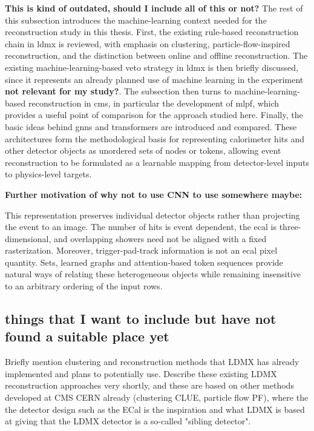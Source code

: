 \textbf{This is kind of outdated, should I include all of this or not?} The rest of this subsection introduces the machine-learning context needed for the reconstruction study in this thesis. First, the existing rule-based reconstruction chain in \gls{ldmx} is reviewed, with emphasis on clustering, particle-flow-inspired reconstruction, and the distinction between online and offline reconstruction. The existing machine-learning-based veto strategy in \gls{ldmx} is then briefly discussed, since it represents an already planned use of machine learning in the experiment \textbf{not relevant for my study?}. The subsection then turns to machine-learning-based reconstruction in \gls{cms}, in particular the development of \gls{mlpf}, which provides a useful point of comparison for the approach studied here. Finally, the basic ideas behind \glspl{gnn} and transformers are introduced and compared. These architectures form the methodological basis for representing calorimeter hits and other detector objects as unordered sets of nodes or tokens, allowing event reconstruction to be formulated as a learnable mapping from detector-level inputs to physics-level targets.

\textbf{Further motivation of why not to use CNN to use somewhere maybe:}

This representation preserves individual detector objects rather than
projecting the event to an image. The number of hits is event dependent, the
\gls{ecal} is three-dimensional, and overlapping showers need not be aligned
with a fixed rasterization. Moreover, trigger-pad-track information is not an
\gls{ecal} pixel quantity. Sets, learned graphs and attention-based token
sequences provide natural ways of relating these heterogeneous objects while
remaining insensitive to an arbitrary ordering of the input rows.

\subsection{things that I want to include but have not found a suitable place yet}

Briefly mention clustering and reconstruction methods that LDMX has already implemented and plans to potentially use. Describe these existing LDMX reconstruction approaches very shortly, and these are based on other methods developed at CMS CERN already (clustering CLUE, particle flow PF), where the the detector design such as the ECal is the inspiration and what LDMX is based at giving that the LDMX detector is a so-called "sibling detector".

